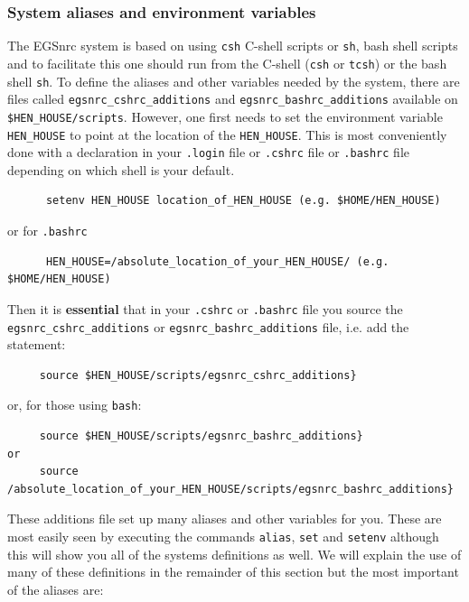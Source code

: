 \subsubsection{System aliases and environment variables}
 
 
The EGSnrc system is based on using {\tt csh} C-shell scripts or {\tt sh},
bash shell scripts and to
facilitate this one should run from the C-shell ({\tt csh} or {\tt tcsh})
or the bash shell {\tt sh}.
To define the
aliases and other variables needed by the system, there are files called
{\tt egsnrc\_cshrc\_additions} and {\tt egsnrc\_bashrc\_additions} available on
{\tt \$HEN\_HOUSE/scripts}.
However, one first needs to set the environment variable {\tt HEN\_HOUSE}
to point at the location of the {\tt HEN\_HOUSE}. This is most conveniently
done with a declaration in your {\tt .login} file or {\tt .cshrc} file or
{\tt .bashrc} file depending on which shell is your default.
\begin{verbatim}
      setenv HEN_HOUSE location_of_HEN_HOUSE (e.g. $HOME/HEN_HOUSE)
\end{verbatim}
or for {\tt .bashrc}
\begin{verbatim}
      HEN_HOUSE=/absolute_location_of_your_HEN_HOUSE/ (e.g. $HOME/HEN_HOUSE)
\end{verbatim}
Then it is {\bfseries essential} that in your {\tt .cshrc} or {\tt .bashrc}
file you source the
{\tt  egsnrc\_cshrc\_additions} or {\tt egsnrc\_bashrc\_additions} file, i.e. add the statement:
\begin{verbatim}
     source $HEN_HOUSE/scripts/egsnrc_cshrc_additions}
\end{verbatim}
or, for those using {\tt bash}:
\begin{verbatim}
     source $HEN_HOUSE/scripts/egsnrc_bashrc_additions}
or
     source /absolute_location_of_your_HEN_HOUSE/scripts/egsnrc_bashrc_additions}
\end{verbatim}

These additions file set up many aliases and other variables for you. These
are most easily seen by executing the commands {\tt alias}, {\tt set} and
{\tt setenv} although this will show you all of the systems definitions as
well.  We will explain the use of many of these definitions in the
remainder of this section but the most important of the aliases are:

